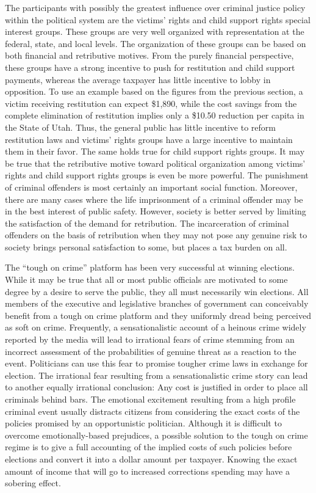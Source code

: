 The participants with possibly the greatest influence over criminal justice policy within the political system are the victims' rights and child support rights special interest groups.  These groups are very well organized with representation at the federal, state, and local levels.  The organization of these groups can be based on both financial and retributive motives.  From the purely financial perspective, these groups have a strong incentive to push for restitution and child support payments, whereas the average taxpayer has little incentive to lobby in opposition.  To use an example based on the figures from the previous section, a victim receiving restitution can expect \$1,890, while the cost savings from the complete elimination of restitution implies only a \$10.50 reduction per capita in the State of Utah.  Thus, the general public has little incentive to reform restitution laws and victims' rights groups have a large incentive to maintain them in their favor.  The same holds true for child support rights groups.  It may be true that the retributive motive toward political organization among victims' rights and child support rights groups is even be more powerful.  The punishment of criminal offenders is most certainly an important social function.  Moreover, there are many cases where the life imprisonment of a criminal offender may be in the best interest of public safety.  However, society is better served by limiting the satisfaction of the demand for retribution.  The incarceration of criminal offenders on the basis of retribution when they may not pose any genuine risk to society brings personal satisfaction to some, but places a tax burden on all.

The ``tough on crime'' platform has been very successful at winning elections.  While it may be true that all or most public officials are motivated to some degree by a desire to serve the public, they all must necessarily win elections.  All members of the executive and legislative branches of government can conceivably benefit from a tough on crime platform and they uniformly dread being perceived as soft on crime.  Frequently, a sensationalistic account of a heinous crime widely reported by the media will lead to irrational fears of crime stemming from an incorrect assessment of the probabilities of genuine threat as a reaction to the event.  Politicians can use this fear to promise tougher crime laws in exchange for election.  The irrational fear resulting from a sensationalistic crime story can lead to another equally irrational conclusion:  Any cost is justified in order to place all criminals behind bars.  The emotional excitement resulting from a high profile criminal event usually distracts citizens from considering the exact costs of the policies promised by an opportunistic politician.  Although it is difficult to overcome emotionally-based prejudices, a possible solution to the tough on crime regime is to give a full accounting of the implied costs of such policies before elections and convert it into a dollar amount per taxpayer.  Knowing the exact amount of income that will go to increased corrections spending may have a sobering effect.

